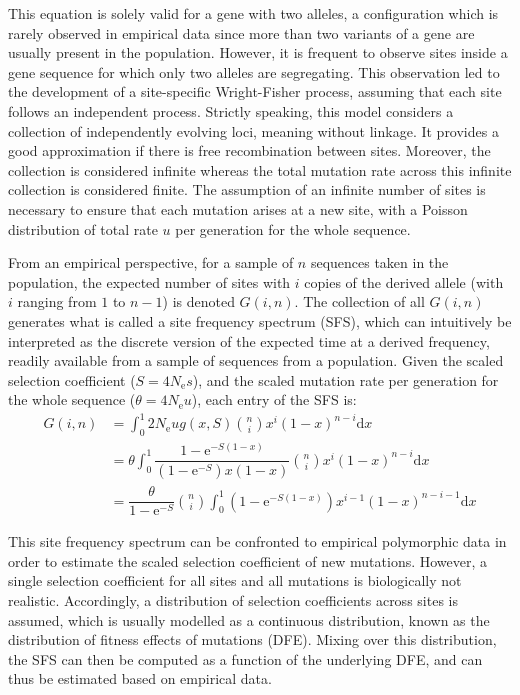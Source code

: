 \documentclass{article}
\newcommand{\der}{\mathrm{d}}
\newcommand{\e}{\mathrm{e}}
\newcommand{\Ne}{N_{\mathrm{e}}}
\begin{document}
    This equation is solely valid for a gene with two alleles, a configuration which is rarely observed in empirical data since more than two variants of a gene are usually present in the population.
    However, it is frequent to observe sites inside a gene sequence for which only two alleles are segregating.
    This observation led to the development of a site-specific Wright-Fisher process, assuming that each site follows an independent process.
    Strictly speaking, this model considers a collection of independently evolving loci, meaning without linkage.
    It provides a good approximation if there is free recombination between sites.
    Moreover, the collection is considered infinite whereas the total mutation rate across this infinite collection is considered finite.
    The assumption of an infinite number of sites is necessary to ensure that each mutation arises at a new site, with a Poisson distribution of total rate $u$ per generation for the whole sequence.

    From an empirical perspective, for a sample of $n$ sequences taken in the population, the expected number of sites with $i$ copies of the derived allele (with $i$ ranging from $1$ to $n - 1$) is denoted $G(i, n)$.
    The collection of all $G(i, n)$ generates what is called a site frequency spectrum ({SFS}), which can intuitively be interpreted as the discrete version of the expected time at a derived frequency, readily available from a sample of sequences from a population.
    Given the scaled selection coefficient ($S=4 \Ne s$), and the scaled mutation rate per generation for the whole sequence ($\theta = 4 \Ne u $), each entry of the {SFS} is:
    \begin{align}
        G(i, n) & = \int_{0}^{1}  2 \Ne u g(x, S) \binom{n}{i} x^{i} (1-x)^{n-i} \der x \\
        & = \theta \int_{0}^{1} \dfrac{1 - \e^{-S(1-x)}}{(1 - \e^{-S})x(1-x)} \binom{n}{i} x^{i} (1-x)^{n-i} \der x \\
        & =  \dfrac{\theta }{1 - \e^{-S}} \binom{n}{i} \int_{0}^{1} \left( 1 - \e^{-S(1-x)} \right) x^{i-1} (1-x)^{n-i-1} \der x
    \end{align}

    This site frequency spectrum can be confronted to empirical polymorphic data in order to estimate the scaled selection coefficient of new mutations.
    However, a single selection coefficient for all sites and all mutations is biologically not realistic.
    Accordingly, a distribution of selection coefficients across sites is assumed, which is usually modelled as a continuous distribution, known as the distribution of fitness effects of mutations (DFE).
    Mixing over this distribution, the SFS can then be computed as a function of the underlying DFE, and can thus be estimated based on empirical data\cite{eyre-walker_distribution_2006, eyre-walker_estimating_2009}.

    \printbibliography

    
\end{document}
